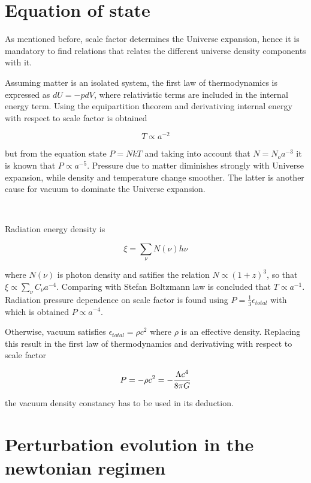 \section{ Equation of state }

As mentioned before, scale factor determines the Universe expansion, 
hence it is mandatory to find relations that relates the different universe 
density components with it. 

Assuming matter is an isolated system, the first law of thermodynamics is
expressed as $dU = -pdV$, where relativistic terms are included in the 
internal energy term. Using the equipartition theorem and derivativing 
internal energy with respect to scale factor is obtained 

\[ T \propto a^{-2} \]

but from the equation state $P = NkT$ and taking into account that $N = N_oa^{-3}$  
it is known that  $P \propto a^{-5}$. Pressure due to matter diminishes 
strongly with Universe expansion, while density and temperature change smoother. 
The latter is another cause for vacuum to dominate the Universe expansion. 

\

Radiation energy density is

\[\xi=\sum_{\nu}N(\nu)h\nu\]

where $N(\nu)$ is photon density and satifies the relation $N \propto (1+z)^3$,
so that $\xi \propto  \sum_\nu C_\nu a^{-4} $. Comparing with Stefan Boltzmann
law is concluded that $T\propto a^{-1}$. Radiation pressure dependence on scale
factor is found using $ P=\frac{1}{3}\epsilon_{total}$ with which is obtained
$P \propto a^{-4}$. 

Otherwise, vacuum satisfies $\epsilon_{total}=\rho c^2$ where $\rho$
is an effective density. Replacing this result in the first law of thermodynamics
and derivativing with respect to scale factor  

\[ P=-\rho c^2 = -\frac{ \Lambda c^4}{8\pi G}\]

the vacuum density constancy has to be used in its deduction.

\section{ Perturbation evolution in the newtonian regimen }

